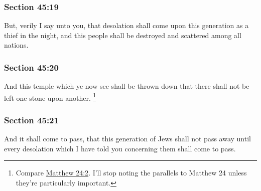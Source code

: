 	\subsubsection{Section 45:19} %
		\label{DC45-19}

		But, verily I say unto you, that desolation shall come upon this generation as a thief in the night, and this people shall be destroyed and scattered among all nations.


	\subsubsection{Section 45:20} %
		\label{DC45-20}

		And this temple which ye now see shall be thrown down that there shall not be left one stone upon another.%
			\footnote{%
				Compare \hyperref[MATTHEW-24-2]{Matthew 24:2}. I'll stop noting the parallels to Matthew 24 unless they're particularly important.
				}


	\subsubsection{Section 45:21} %
		\label{DC45-21}

		And it shall come to pass, that this generation of Jews shall not pass away until every desolation which I have told you concerning them shall come to pass.


